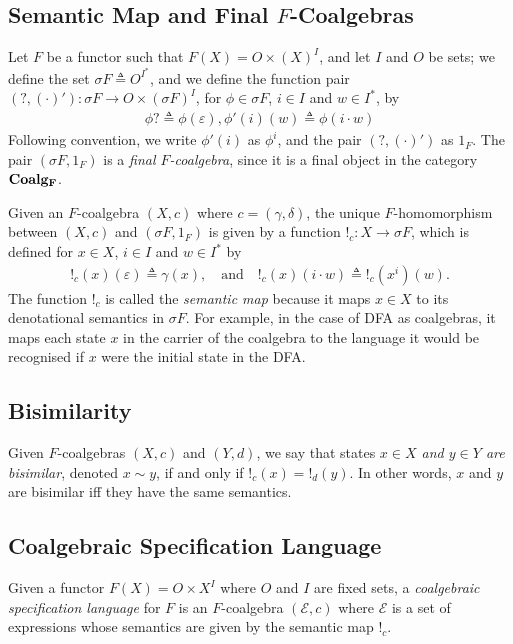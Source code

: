 \subsection{Semantic Map and Final $F$-Coalgebras}
Let $F$ be a functor such that $F(X)=O\times (X)^I$, and let $I$ and $O$ be sets; we define the set $\sigma F\triangleq O^{I^*}$, and we define the function pair $(?, (\cdot)')\colon \sigma F\rightarrow O\times (\sigma F)^I$, for $\phi \in \sigma F$, $i\in I$ and $w\in I^*$, by
\begin{align}
    \phi? \triangleq \phi(\varepsilon),
    \phi'(i)(w) \triangleq \phi(i\cdot w)
\end{align}
Following convention, we write $\phi'(i)$ as $\phi^i$, and the pair $(?, (\cdot)')$ as $1_F$. The pair $(\sigma F, 1_F)$ is a \emph{final $F$-coalgebra}, since it is a final object in the category $\AsCategory{Coalg_F}$.

Given an $F$-coalgebra $(X,c)$ where $c=(\gamma,\delta)$, the unique $F$-homomorphism between $(X,c)$ and $(\sigma F, 1_F)$ is given by a function $!_c\colon X\rightarrow \sigma F$, which is defined for $x\in X$, $i\in I$ and $w\in I^*$ by 
\begin{align}
    !_c(x)(\varepsilon)\triangleq \gamma(x),\quad \text{and} \quad 
    !_c(x)(i\cdot w)\triangleq !_c(x^i)(w).
\end{align}
The function $!_c$ is called the \emph{semantic map} because it maps $x\in X$ to its denotational semantics in $\sigma F$. For example, in the case of DFA as coalgebras, it maps each state $x$ in the carrier of the coalgebra to the language it would be recognised if $x$ were the initial state in the DFA.

\subsection{Bisimilarity}
Given $F$-coalgebras $(X,c)$ and $(Y,d)$, we say that states \emph{$x\in X$ and $y\in Y$ are bisimilar}, denoted $x\sim y$, if and only if $!_c(x)=!_d(y)$. In other words, $x$ and $y$ are bisimilar iff they have the same semantics.

\subsection{Coalgebraic Specification Language}
Given a functor $F(X)=O\times X^I$ where $O$ and $I$ are fixed sets, a \emph{coalgebraic specification language} for $F$ is an $F$-coalgebra $(\mathcal{E},c)$ where $\mathcal{E}$ is a set of expressions whose semantics are given by the semantic map $!_c$.

